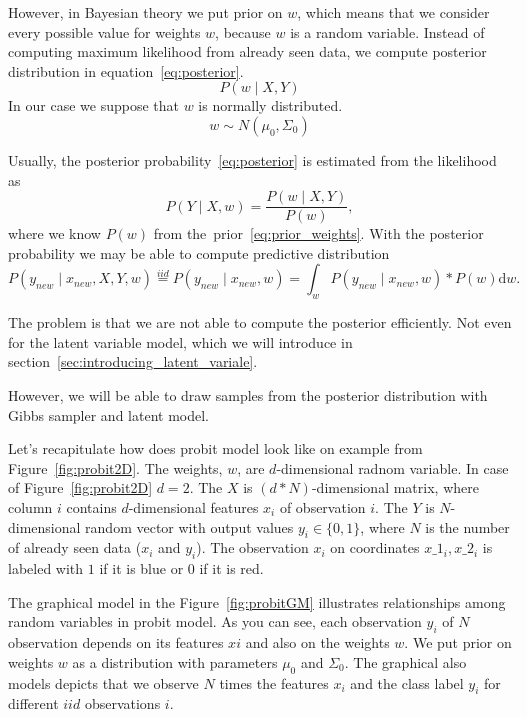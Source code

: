 However, in Bayesian theory we put prior on $w$, which means that we consider every possible value for weights $w$, because $w$ is a random variable. Instead of computing maximum likelihood from already seen data, we compute posterior distribution in equation~\ref{eq:posterior}.
\begin{equation}\label{eq:posterior}
    P(w \mid X, Y) 
\end{equation}
In our case we suppose that $w$ is normally distributed.
\begin{equation}\label{eq:prior_weights}
w \sim N(\mu_0, \Sigma_0)
\end{equation}

Usually, the posterior probability~\ref{eq:posterior} is estimated from the likelihood as
\begin{equation}
    P(Y \mid X, w) = \frac{P(w \mid X,Y)}{P(w)},
\end{equation}
where we know $P(w)$ from the~prior~\ref{eq:prior_weights}.
With the posterior probability we may be able to compute predictive distribution 
\begin{equation}
P(y_{new} \mid x_{new},X, Y, w) \overset{iid}{=} P(y_{new} \mid x_{new}, w) = \int_w P(y_{new} \mid x_{new}, w) * P(w) \mathrm{d} w.
\end{equation}

The problem is that we are not able to compute the posterior efficiently. Not even for the latent variable model, which we will introduce in section~\ref{sec:introducing_latent_variale}.

However, we will be able to draw samples from the posterior distribution with Gibbs sampler and latent model.

Let's recapitulate how does probit model look like on example from Figure~\ref{fig:probit2D}.
The weights, $w$, are $d$-dimensional radnom variable. In case of Figure~\ref{fig:probit2D} $d=2$.
The $X$ is $(d*N)$-dimensional matrix, where column $i$ contains $d$-dimensional features $x_i$ of observation $i$.
The $Y$ is $N$-dimensional random vector with output values $y_i \in \{0,1\}$, where $N$ is the number of already seen data ($x_i$ and $y_i$).
The observation $x_i$ on coordinates $x\_1_i,x\_2_i$ is labeled with $1$ if it is blue or $0$ if it is red.

The graphical model in the Figure~\ref{fig:probitGM} illustrates relationships among random variables in probit model. As you can see, each observation $y_i$ of $N$ observation depends on its features $xi$ and also on the weights $w$. We put prior on weights $w$ as a distribution with parameters $\mu_0$ and $\Sigma_0$. The graphical also models depicts that we observe $N$ times the features $x_i$ and the class label $y_i$ for different $iid$ observations $i$.

